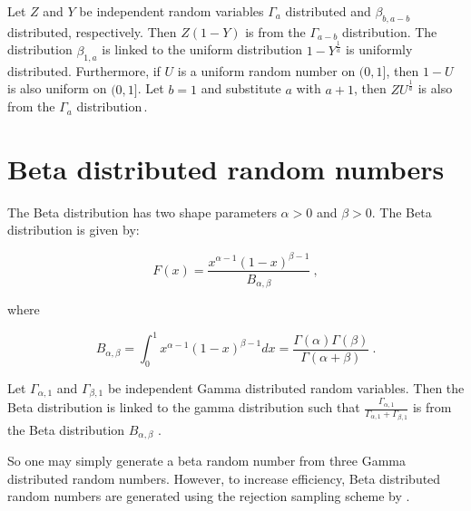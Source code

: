 \documentclass[a4paper]{scrartcl}
\begin{document}
Let $Z$ and $Y$ be independent random variables $\Gamma_{a}$ distributed and $\beta_{b, a - b}$ distributed, respectively. Then $Z(1 - Y)$
 is from the $\Gamma_{a - b }$ distribution. The distribution $\beta_{1, a}$ is linked to the uniform distribution $1 - Y^{\frac{1}{a}}$ is uniformly distributed. Furthermore, if $U$ is a uniform random number on $(0, 1]$, then $1 - U$ is also uniform on $(0,1]$. Let $b = 1$ and substitute $a$ with $a + 1$, then $Z U^{\frac{1}{a}}$ is also from the $\Gamma_{a}$ distribution\,\citep{Stuart1962, Devroye1986}.

\section*{Beta distributed random numbers}
The Beta distribution has two shape parameters $\alpha > 0$ and $\beta > 0$. The Beta distribution is given by:

\begin{equation}
F(x) = \frac{x^{\alpha - 1}(1-x)^{\beta-1}}{B_{\alpha, \beta}}~,
\end{equation}

where

\begin{equation}
B_{\alpha, \beta} = \int_{0}^{1} x^{\alpha-1} (1-x)^{\beta-1} dx = \frac{\Gamma(\alpha) \Gamma(\beta)}{\Gamma(\alpha + \beta)}~.
\end{equation}

Let $\Gamma_{\alpha, 1}$ and $\Gamma_{\beta, 1}$ be independent Gamma distributed random variables. Then the Beta distribution is linked to the gamma distribution such that $\frac{\Gamma_{\alpha,1}}{\Gamma_{\alpha, 1} + \Gamma_{\beta,1}}$ is from the Beta distribution $B_{\alpha, \beta}$ \cite{Devroye1986}.

So one may simply generate a beta random number from three Gamma distributed random numbers. However, to increase efficiency, Beta distributed random numbers are generated using the rejection sampling scheme by \citet{Cheng1978}.

%


\end{document}
